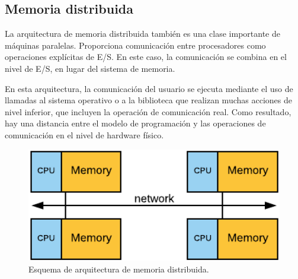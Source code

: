 \vspace{0.35cm}
\begin{table}[htbp]
\centering
\caption{Ventajas y desventajas del modelo de programación basado en tareas.}
\label{tab:tasking_model}
\end{table}
\vspace{0.35cm}

\subsection{Memoria distribuida}
\label{sec:memoria_distribuida}
La arquitectura de memoria distribuida \cite{tanenbaum2007distributed} también es una clase importante de máquinas paralelas. Proporciona comunicación entre procesadores como operaciones explícitas de E/S. En este caso, la comunicación se combina en el nivel de E/S, en lugar del sistema de memoria.

En esta arquitectura, la comunicación del usuario se ejecuta mediante el uso de llamadas al sistema operativo o a la biblioteca que realizan muchas acciones de nivel inferior, que incluyen la operación de comunicación real. Como resultado, hay una distancia entre el modelo de programación y las operaciones de comunicación en el nivel de hardware físico.

\vspace{0.35cm}
\begin{figure}[h]
 	\centering
 	\includegraphics[width=11.5cm]{figures/distributed_memory}
 	\caption{Esquema de arquitectura de memoria distribuida.}
 	\label{fig:chap2:distributed_memory}
\end{figure}  
\vspace{0.35cm}

